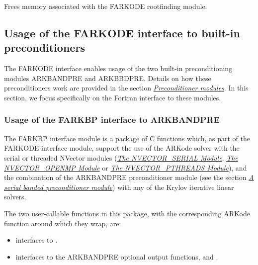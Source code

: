 \documentclass[letterpaper,10pt,english]{sphinxmanual}
\begin{document}
\begin{fulllineitems}
\label{f_interface/Rootfinding:f/_/FARKROOTFREE}
Frees memory associated with the FARKODE rootfinding module.

\end{fulllineitems}



\subsection{Usage of the FARKODE interface to built-in preconditioners}
\label{f_interface/Preconditioning:finterface-preconditioning}\label{f_interface/Preconditioning::doc}\label{f_interface/Preconditioning:usage-of-the-farkode-interface-to-built-in-preconditioners}
The FARKODE interface enables usage of the two built-in
preconditioning modules ARKBANDPRE and ARKBBDPRE.  Details on how
these preconditioners work are provided in the section
{\hyperref[c_interface/Preconditioners:cinterface-preconditionermodules]{\emph{Preconditioner modules}}}.  In this section, we focus
specifically on the Fortran interface to these modules.


\subsubsection{Usage of the FARKBP interface to ARKBANDPRE}
\label{f_interface/Preconditioning:usage-of-the-farkbp-interface-to-arkbandpre}\label{f_interface/Preconditioning:finterface-bandpre}
The FARKBP interface module is a package of C functions which,
as part of the FARKODE interface module, support the use of the
ARKode solver with the serial or threaded NVector modules
({\hyperref[nvectors/NVector_Serial:nvectors-nvserial]{\emph{The NVECTOR\_SERIAL Module}}}, {\hyperref[nvectors/NVector_OpenMP:nvectors-openmp]{\emph{The NVECTOR\_OPENMP Module}}} or
{\hyperref[nvectors/NVector_Pthreads:nvectors-pthreads]{\emph{The NVECTOR\_PTHREADS Module}}}), and the combination of the ARKBANDPRE
preconditioner module (see the section {\hyperref[c_interface/Preconditioners:cinterface-bandpre]{\emph{A serial banded preconditioner module}}}) with
any of the Krylov iterative linear solvers.

The two user-callable functions in this package, with the
corresponding ARKode function around which they wrap, are:
\begin{itemize}
\item {} 
{\hyperref[f_interface/Preconditioning:f/_/FARKBPINIT]{}} interfaces to {\hyperref[c_interface/Preconditioners:ARKBandPrecInit]{}}.

\item {} 
{\hyperref[f_interface/Preconditioning:f/_/FARKBPOPT]{}} interfaces to the ARKBANDPRE optional output
functions, {\hyperref[c_interface/Preconditioners:ARKBandPrecGetWorkSpace]{}} and
{\hyperref[c_interface/Preconditioners:ARKBandPrecGetNumRhsEvals]{}}.

\end{itemize}
\end{document}

